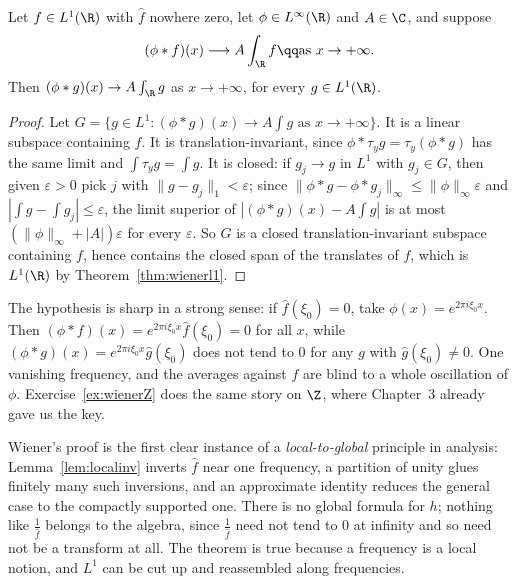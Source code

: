 \begin{theorem}\label{thm:wienertaub}
Let $f\in L^1(\R)$ with $\hat f$ nowhere zero, let $\phi\in L^\infty(\R)$ and $A\in\C$, and suppose
\[
(\phi*f)(x)\longrightarrow A\int_\R f\qq\text{as }x\to+\infty.
\]
Then $(\phi*g)(x)\to A\int_\R g$ as $x\to+\infty$, for every $g\in L^1(\R)$.
\end{theorem}
\begin{proof}
Let $G=\{g\in L^1:(\phi*g)(x)\to A\int g\text{ as }x\to+\infty\}$. It is a linear subspace containing $f$. It is translation-invariant, since
$\phi*\tau_yg=\tau_y(\phi*g)$ has the same limit and $\int\tau_yg=\int g$. It is closed: if $g_j\to g$ in $L^1$ with $g_j\in G$, then given $\varepsilon>0$ pick $j$
with $\|g-g_j\|_1<\varepsilon$; since $\|\phi*g-\phi*g_j\|_\infty\le\|\phi\|_\infty\varepsilon$ and $|\int g-\int g_j|\le\varepsilon$, the limit superior of
$|(\phi*g)(x)-A\int g|$ is at most $(\|\phi\|_\infty+|A|)\varepsilon$ for every $\varepsilon$. So $G$ is a closed translation-invariant subspace containing $f$, hence
contains the closed span of the translates of $f$, which is $L^1(\R)$ by Theorem~\ref{thm:wienerl1}.
\end{proof}

\begin{remark}
The hypothesis is sharp in a strong sense: if $\hat f(\xi_0)=0$, take $\phi(x)=e^{2\pi i\xi_0x}$. Then $(\phi*f)(x)=e^{2\pi i\xi_0x}\hat f(\xi_0)=0$ for all $x$, while
$(\phi*g)(x)=e^{2\pi i\xi_0x}\hat g(\xi_0)$ does not tend to $0$ for any $g$ with $\hat g(\xi_0)\ne0$. One vanishing frequency, and the averages against $f$ are
blind to a whole oscillation of $\phi$. Exercise~\ref{ex:wienerZ} does the same story on $\Z$, where Chapter~3 already gave us the key.
\end{remark}

\begin{beauty}
Wiener's proof is the first clear instance of a \emph{local-to-global} principle in analysis: Lemma~\ref{lem:localinv} inverts $\hat f$ near one frequency, a
partition of unity glues finitely many such inversions, and an approximate identity reduces the general case to the compactly supported one. There is no
global formula for $h$; nothing like $\frac1{\hat f}$ belongs to the algebra, since $\frac1{\hat f}$ need not tend to $0$ at infinity and so need not be a
transform at all. The theorem is true because a frequency is a local notion, and $L^1$ can be cut up and reassembled along frequencies.
\end{beauty}


